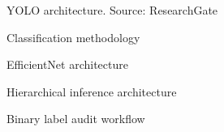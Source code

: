 \begin{figure}[H]
\centering
{}
\caption{YOLO architecture. Source: ResearchGate}
\label{fig:yolo_arch}
\end{figure}

\begin{figure}[H]
\centering
{}
\caption{Classification methodology}
\label{fig:classification_methodology}
\end{figure}

\begin{figure}[H]
\centering
{}
\caption{EfficientNet architecture}
\label{fig:efficientnet_arch}
\end{figure}


\begin{figure}[H]
\centering
{}
\caption{Hierarchical inference architecture}
\label{fig:hierarchical_arch}
\end{figure}

\begin{figure}[H]
\centering
{}
\caption{Binary label audit workflow}
\label{fig:audit_arch}
\end{figure}
